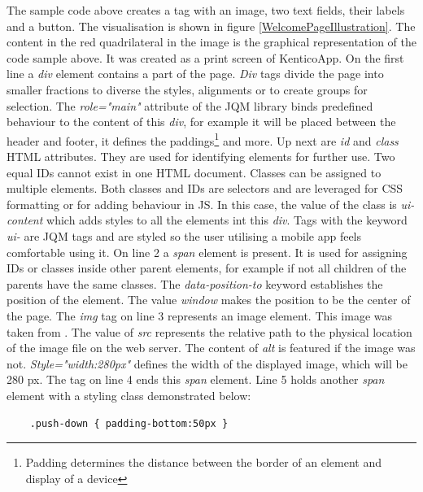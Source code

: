 The sample code above creates a tag with an image, two text fields, their labels and a button. The visualisation is shown in figure \ref{WelcomePageIllustration}. The content in the red quadrilateral in the image is the graphical representation of the code sample above. It was created as a print screen of KenticoApp. On the first line a \textit{div} element contains a part of the page. \textit{Div} tags divide the page into smaller fractions to diverse the styles, alignments or to create groups for selection. The \textit{role="main"} attribute of the JQM library binds predefined behaviour to the content of this \textit{div}, for example it will be placed between the header and footer, it defines the paddings\footnote{Padding determines the distance between the border of an element and display of a device} and more. Up next are \textit{id} and \textit{class} HTML attributes. They are used for identifying elements for further use. Two equal IDs cannot exist in one HTML document. Classes can be assigned to multiple elements. Both classes and IDs are selectors and are leveraged for CSS formatting or for adding behaviour in JS. In this case, the value of the class is \textit{ui-content} which adds styles to all the elements int this \textit{div}. Tags with the keyword \textit{ui-} are JQM tags and are styled so the user utilising a mobile app feels comfortable using it. On line 2 a \textit{span} element is present. It is used for assigning IDs or classes inside other parent elements, for example if not all children of the parents have the same classes. The \textit{data-position-to} keyword establishes the position of the element. The value \textit{window} makes the position to be the center of the page. The \textit{img} tag on line 3 represents an image element. This image was taken from \cite{kenticoLogo}. The value of \textit{src} represents the relative path to the physical location of the image file on the web server. The content of \textit{alt} is featured if the image was not. \textit{Style="width:280px"} defines the width of the displayed image, which will be 280 px. The tag on line 4 ends this \textit{span} element. Line 5 holds another \textit{span} element with a styling class demonstrated below:
\lstset{style=sharpc, numbers=none}
\begin{lstlisting}
	.push-down { padding-bottom:50px }
\end{lstlisting}
